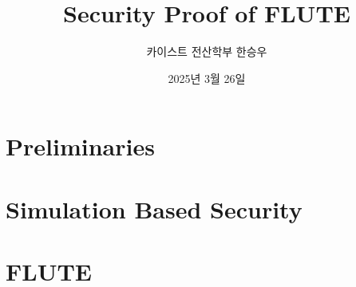\documentclass[handout]{beamer}
\title{Security Proof of FLUTE}
\author{카이스트 전산학부 한승우}
\date{2025년 3월 26일}
\begin{document}
\begin{frame}
    \titlepage
\end{frame}

\section{Preliminaries}


\section{Simulation Based Security}


\section{FLUTE}


\section*{\mbox{}}

\end{document}
